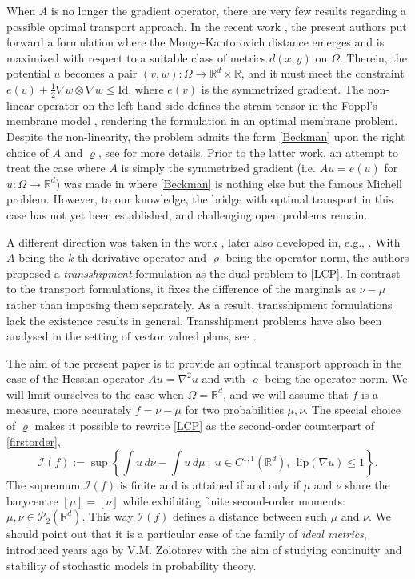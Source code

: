 \documentclass[11pt,letterpaper,reqno]{amsart}
\theoremstyle{definition}
\numberwithin{equation}{section}
\newcommand{\R}{\mathbb{R}}
\newcommand{\Rd}{\R^d}
\def\O{\Omega}
\newcommand{\PP}{\mathcal{P}}
\newcommand{\Lip}{{\mathrm{lip}}}
\newcommand{\I}{\mathcal{I}}
\begin{document}
When $A$ is no longer the gradient operator, there are very few results regarding a possible optimal transport approach.
 In the recent work \cite{bolbou2022}, the present authors put forward a formulation where
  the Monge-Kantorovich distance emerges and is maximized with respect to a suitable class of metrics $d(x,y)$ on $\Omega$.
Therein, the potential $u$ becomes a pair $(v,w):\Omega \to \Rd\times \R$, and it must meet the constraint $e(v)+\frac{1}{2} \nabla w \otimes \nabla w \leq \mathrm{Id}$, where $e(v)$ is the symmetrized gradient.  The non-linear operator on the left hand side defines the strain tensor in the F\"{o}ppl's membrane model \cite{conti2006}, rendering the formulation in \cite{bolbou2022} an optimal membrane problem. Despite the non-linearity, the problem admits the form \eqref{Beckman} upon the right choice of $A$ and $\varrho$, see \cite{bolbou2022} for more details.
 Prior to the latter work, an attempt to treat the case where $A$ is simply the symmetrized gradient (i.e. $Au= e(u)$ for $u:\O\to \R^d$) was made in \cite{bouchitte2008} where \eqref{Beckman} is nothing else but the famous Michell problem. 
However, to our knowledge, the bridge with optimal transport in this case  has not yet been established, and  challenging open problems remain.



A different direction was taken in the work \cite{hanin1994}, later also developed in, e.g., \cite{hanin1997,olubummo2004}. With $A$ being the $k$-th derivative operator and $\varrho$ being the operator norm, the authors proposed a \textit{transshipment} formulation as the dual problem to \eqref{LCP}.  In contrast to the transport formulations, it fixes the difference of the marginals as $\nu-\mu$ rather than imposing them separately. As a result, transshipment formulations lack the existence results in general. Transshipment problems have also been analysed in the setting of vector valued plans, see \cite{ciosmak2021}.


 
\medskip

 The aim of the present paper is to provide an optimal transport approach in the case of  the Hessian operator  $Au = \nabla^2 u$ and with  $\varrho$ being the operator norm. We will limit ourselves to the case when $\Omega = \Rd$, and we will assume that $f$ is a measure, more accurately
 $f= \nu-\mu$
 for two probabilities $\mu,\nu$. The special choice of $\varrho$ makes it possible to rewrite \eqref{LCP} as the second-order counterpart of \eqref{firstorder},
\begin{equation}\label{secondorder} \I(f) := \sup\left\{  \int u \, d\nu -   \int u \, d\mu \ :\  u\in C^{1,1}(\R^d),\ \  \Lip(\nabla u)\le 1\right\}.
\end{equation}
The supremum  $\I(f)$ is finite and is attained if and only if $\mu$ and $ \nu$  share the barycentre $[\mu]=[\nu]$ while exhibiting finite second-order moments: $\mu, \nu \in \PP_2(\Rd)$.  This way $\I(f)$ defines a distance between such  $\mu$ and $\nu$.   We should point out that it is a particular case of the family of  \textit{ideal metrics}, introduced years ago by V.M. Zolotarev \cite{zolotarev1977} with the aim of studying continuity and stability of stochastic models in probability theory.
\end{document}
